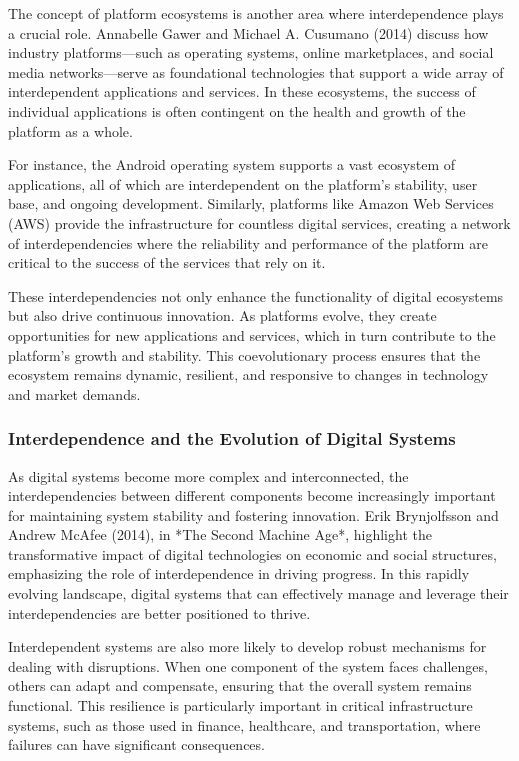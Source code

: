 \documentclass[12pt,twoside]{article}
\begin{document}
The concept of platform ecosystems is another area where interdependence plays a crucial role. Annabelle Gawer and Michael A. Cusumano (2014) discuss how industry platforms—such as operating systems, online marketplaces, and social media networks—serve as foundational technologies that support a wide array of interdependent applications and services. In these ecosystems, the success of individual applications is often contingent on the health and growth of the platform as a whole.

For instance, the Android operating system supports a vast ecosystem of applications, all of which are interdependent on the platform's stability, user base, and ongoing development. Similarly, platforms like Amazon Web Services (AWS) provide the infrastructure for countless digital services, creating a network of interdependencies where the reliability and performance of the platform are critical to the success of the services that rely on it.

These interdependencies not only enhance the functionality of digital ecosystems but also drive continuous innovation. As platforms evolve, they create opportunities for new applications and services, which in turn contribute to the platform's growth and stability. This coevolutionary process ensures that the ecosystem remains dynamic, resilient, and responsive to changes in technology and market demands.

\subsubsection{Interdependence and the Evolution of Digital Systems}

As digital systems become more complex and interconnected, the interdependencies between different components become increasingly important for maintaining system stability and fostering innovation. Erik Brynjolfsson and Andrew McAfee (2014), in *The Second Machine Age*, highlight the transformative impact of digital technologies on economic and social structures, emphasizing the role of interdependence in driving progress. In this rapidly evolving landscape, digital systems that can effectively manage and leverage their interdependencies are better positioned to thrive.

Interdependent systems are also more likely to develop robust mechanisms for dealing with disruptions. When one component of the system faces challenges, others can adapt and compensate, ensuring that the overall system remains functional. This resilience is particularly important in critical infrastructure systems, such as those used in finance, healthcare, and transportation, where failures can have significant consequences.
\end{document}

